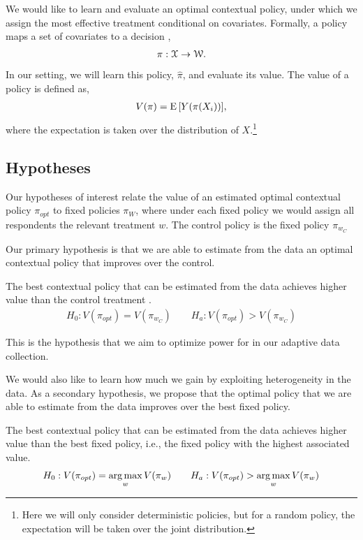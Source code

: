 \documentclass[letterpaper, 12pt, parskip=full,]{scrartcl}
\begin{document}
We would like to learn and evaluate an optimal contextual policy, under which we assign the most effective treatment conditional on covariates. Formally, a policy maps a set of covariates to a decision \citep{athey2017efficient}, %
\begin{align}
  \pi: {\EuScript X} \rightarrow {\EuScript W}. 
  \label{eq:policy}
\end{align}
In our setting, we will learn this policy, $\hat \pi$, and evaluate its value. The value of a policy is defined as, 
\begin{align}
V(\pi) =  {\textrm E}\,[Y(\pi(X_{i}))],
  \label{eq:policy_value}
\end{align}
where the expectation is taken over the distribution of $X$.\footnote{Here we will only consider deterministic policies, but for a random policy, the expectation will be taken over the joint distribution. }

\subsection{Hypotheses}\label{hypotheses}

Our hypotheses of interest relate the value of an estimated optimal contextual policy $\pi_{opt}$ to fixed policies $\pi_{W}$, where under each fixed policy we would assign all respondents the relevant treatment $w$. The control policy is the fixed policy $\pi_{w_{C}}$

Our primary hypothesis is that we are able to estimate from the data an optimal contextual policy that improves over the control. 
  \begin{hypothesis}
  The best contextual policy that can be estimated from the data achieves higher value than the control treatment \label{eq:optctr}.
\begin{align}
  H_{0}: V(\pi_{opt}) = V(\pi_{w_{C}}) \qquad H_{a}:  V(\pi_{opt}) > V(\pi_{w_{C}})
\end{align}
\end{hypothesis}
This is the hypothesis that we aim to optimize power for in our adaptive data collection. 

We would also like to learn how much we gain by exploiting heterogeneity in the data. As a secondary hypothesis, we propose that the optimal policy that we are able to estimate from the data improves over the best fixed policy. 
  \begin{hypothesis}
  The best contextual policy that can be estimated from the data achieves higher value than the best fixed policy, i.e., the fixed policy with the highest associated value. 
  \label{eq:optmax}
\begin{align}
  H_{0}: V(\pi_{opt}) = \operatorname*{arg\,max}_w V(\pi_{w}) \qquad H_{a}:  V(\pi_{opt}) > \operatorname*{arg\,max}_w V(\pi_{w})
\end{align}
\end{hypothesis}
\end{document}
